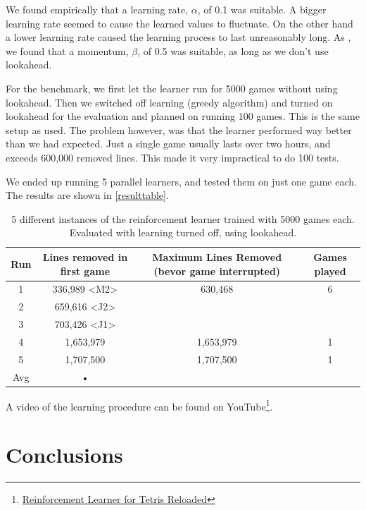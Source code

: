 \documentclass{ml}
\begin{document}
We found empirically that a learning rate, $\alpha$, of 0.1 was suitable. A bigger learning rate seemed to cause the learned values to fluctuate.
On the other hand a lower learning rate caused the learning process to last unreasonably long. 
As \cite{zucker2009learning}, we found that a momentum, $\beta$, of 0.5 was suitable, as long as we don't use lookahead.

For the benchmark, we first let the learner run for 5000 games without using lookahead.
Then we switched off learning (greedy algorithm) and turned on lookahead for the evaluation and planned on running 100 games.
This is the same setup as \cite{zucker2009learning} used.
The problem however, was that the learner performed way better than we had expected. Just a single game usually lasts over two hours, and exceeds 600,000 removed lines.
This made it very impractical to do 100 tests. 

We ended up running 5 parallel learners, and tested them on just one game each. 
The results are shown in \autoref{resulttable}.

\begin{table}
\begin{center}
\begin{tabular}{|c|c|c|c|}
\hline 
Run & Lines removed in first game & Maximum Lines Removed (bevor game interrupted) & Games played\\ 
\hline 
1 & 336,989 <M2> & 630,468 & 6 \\ 
\hline 
2 & 659,616 <J2> &&\\ 
\hline 
3 & 703,426 <J1> &&\\ 
\hline 
4 & 1,653,979 & 1,653,979 & 1\\ 
\hline 
5 & 1,707,500 & 1,707,500 & 1\\ 
\hline 
Avg & • \\ 
\hline 
\end{tabular}
\caption{5 different instances of the reinforcement learner trained with 5000 games each. Evaluated with learning turned off, using lookahead.}
\label{resulttable}
\end{center}
\end{table}


A video of the learning procedure can be found on YouTube\footnote{\href{http://www.youtube.com/watch?v=DXgtzFiRHdc}{Reinforcement Learner for Tetris Reloaded}}.


\section{Conclusions}
\label{conclusions}
\end{document}
